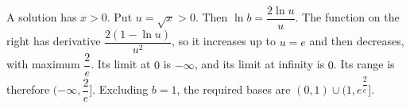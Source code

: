 A solution has $x>0$. Put $u=\sqrt x>0$. Then $\ln b=\dfrac{2\ln u}{u}$. The function on the right has derivative $\dfrac{2(1-\ln u)}{u^2}$, so it increases up to $u=e$ and then decreases, with maximum $\dfrac{2}{e}$. Its limit at $0$ is $-\infty$, and its limit at infinity is $0$. Its range is therefore $(-\infty,\dfrac{2}{e}]$. Excluding $b=1$, the required bases are $\boxed{(0,1)\cup(1,e^{\dfrac{2}{e}}]}$.
